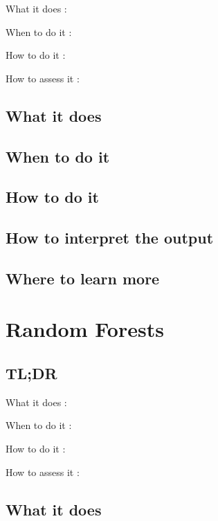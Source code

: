 \documentclass[
]{book}
\begin{document}
What it does
:

When to do it
:

How to do it
:

How to assess it
:

\hypertarget{what-it-does-16}{%
\section{What it does}\label{what-it-does-16}}

\hypertarget{when-to-do-it-16}{%
\section{When to do it}\label{when-to-do-it-16}}

\hypertarget{how-to-do-it-16}{%
\section{How to do it}\label{how-to-do-it-16}}

\hypertarget{how-to-interpret-the-output-16}{%
\section{How to interpret the output}\label{how-to-interpret-the-output-16}}

\hypertarget{where-to-learn-more-16}{%
\section{Where to learn more}\label{where-to-learn-more-16}}

\hypertarget{random-forests}{%
\chapter{Random Forests}\label{random-forests}}

\hypertarget{tldr-17}{%
\section{TL;DR}\label{tldr-17}}

What it does
:

When to do it
:

How to do it
:

How to assess it
:

\hypertarget{what-it-does-17}{%
\section{What it does}\label{what-it-does-17}}
\end{document}
